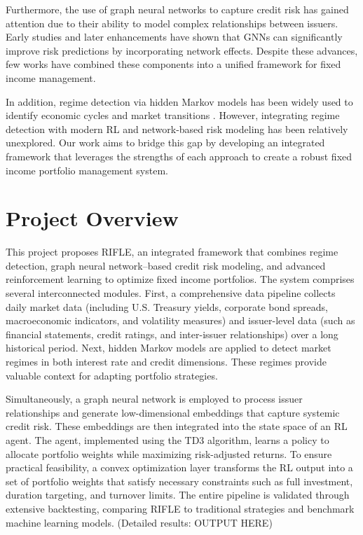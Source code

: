 \documentclass[
  a4paper,
  10pt,
  unnumberedsections,
  twoside,
]{LTJournalArticle}
\begin{document}
Furthermore, the use of graph neural networks to capture credit risk has gained attention due to their ability to model complex relationships between issuers. Early studies \cite{weber2019} and later enhancements \cite{cheng2021, li2020} have shown that GNNs can significantly improve risk predictions by incorporating network effects. Despite these advances, few works have combined these components into a unified framework for fixed income management.

In addition, regime detection via hidden Markov models has been widely used to identify economic cycles and market transitions \cite{hamilton1989, ang2002, mulvey2014, nystrup2018}. However, integrating regime detection with modern RL and network-based risk modeling has been relatively unexplored. Our work aims to bridge this gap by developing an integrated framework that leverages the strengths of each approach to create a robust fixed income portfolio management system.

\section{Project Overview}
This project proposes RIFLE, an integrated framework that combines regime detection, graph neural network–based credit risk modeling, and advanced reinforcement learning to optimize fixed income portfolios. The system comprises several interconnected modules. First, a comprehensive data pipeline collects daily market data (including U.S. Treasury yields, corporate bond spreads, macroeconomic indicators, and volatility measures) and issuer-level data (such as financial statements, credit ratings, and inter-issuer relationships) over a long historical period. Next, hidden Markov models are applied to detect market regimes in both interest rate and credit dimensions. These regimes provide valuable context for adapting portfolio strategies.

Simultaneously, a graph neural network is employed to process issuer relationships and generate low-dimensional embeddings that capture systemic credit risk. These embeddings are then integrated into the state space of an RL agent. The agent, implemented using the TD3 algorithm, learns a policy to allocate portfolio weights while maximizing risk-adjusted returns. To ensure practical feasibility, a convex optimization layer transforms the RL output into a set of portfolio weights that satisfy necessary constraints such as full investment, duration targeting, and turnover limits. The entire pipeline is validated through extensive backtesting, comparing RIFLE to traditional strategies and benchmark machine learning models. (Detailed results: OUTPUT HERE)
\end{document}
